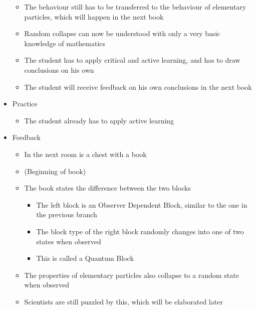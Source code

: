 \documentclass[11pt,twoside]{report} %
\begin{document}
\begin{itemize}
\begin{itemize}
		\item The behaviour still has to be transferred to the behaviour of elementary particles, which will happen in the next book
		\item Random collapse can now be understood with only a very basic knowledge of mathematics
		\item The student has to apply critical and active learning, and has to draw conclusions on his own
		\item The student will receive feedback on his own conclusions in the next book
	\end{itemize}
	\item Practice
	\begin{itemize}
		\item The student already has to apply active learning
	\end{itemize}
	\item Feedback
	\begin{itemize}
		\item In the next room is a chest with a book
		\item (Beginning of book)
		\item The book states the difference between the two blocks
		\begin{itemize}
			\item The left block is an Observer Dependent Block, similar to the one in the previous branch
			\item The block type of the right block randomly changes into one of two states when observed
			\item This is called a Quantum Block
		\end{itemize}
		\item The properties of elementary particles also collapse to a random state when observed
		\item Scientists are still puzzled by this, which will be elaborated later
	\end{itemize}
\end{itemize}
\end{document}
